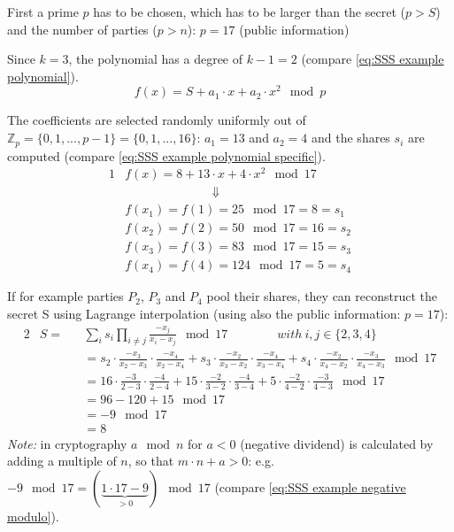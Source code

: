 		First a prime $p$ has to be chosen, which has to be larger than the secret ($p>S$) and the number of parties ($p>n$): $p=17$ (public information)
		
		Since $k=3$, the polynomial has a degree of $k-1=2$ (compare \ref{eq:SSS example polynomial}).
		\begin{equation}
		\label{eq:SSS example polynomial}
		f(x) = S + a_1 \cdot x + a_2 \cdot x^2 \mod p
		\end{equation}
		 
		 The coefficients are selected randomly uniformly out of $\mathbb{Z}_p=\{0,1,...,p-1\}=\{0,1,...,16\}$: $a_1=13$ and $a_2=4$ and the shares $s_i$ are computed (compare \ref{eq:SSS example polynomial specific}).
		 \begin{alignat}{1}
		 & f(x) = 8 + 13 \cdot x + 4 \cdot x^2 \mod 17 \label{eq:SSS example polynomial specific} \\
		 &\qquad \qquad \qquad \quad \Downarrow \nonumber \\ 
		 & f(x_1)=f(1)=25\mod17=8=s_1 \nonumber \\
		 & f(x_2)=f(2)=50\mod17=16=s_2 \nonumber \\
		 & f(x_3)=f(3)=83\mod17=15=s_3 \nonumber \\
		 & f(x_4)=f(4)=124\mod17=5=s_4 \nonumber 
		 \end{alignat}
		 
		 If for example parties $P_2$, $P_3$ and $P_4$ pool their shares, they can reconstruct the secret S using Lagrange interpolation (using also the public information: $p=17$):
		 \begin{alignat}{2}
		 & S = && \sum_i s_i \prod_{i \neq j} \frac{-x_j}{x_i - x_j } \mod 17 \qquad \qquad  with \ i,j \in \{2,3,4\} \\
		 & \quad && =s_2 \cdot \frac{-x_3}{x_2-x_3} \cdot \frac{-x_4}{x_2-x_4} + s_3 \cdot \frac{-x_2}{x_3-x_2} \cdot \frac{-x_4}{x_3-x_4} + s_4 \cdot \frac{-x_2}{x_4-x_2} \cdot \frac{-x_3}{x_4-x_3} \mod 17 \nonumber \\
		 & \quad && =16 \cdot \frac{-3}{2-3} \cdot \frac{-4}{2-4} + 15 \cdot \frac{-2}{3-2} \cdot \frac{-4}{3-4} + 5 \cdot \frac{-2}{4-2} \cdot \frac{-3}{4-3} \mod 17  \nonumber \\
		 & \quad && = 96-120+15 \mod 17 \nonumber \\
		 & \quad && = -9 \mod 17 \label{eq:SSS example negative modulo} \\
		 & \quad && = 8 \nonumber 
		 \end{alignat}
		 \textit{Note:} in cryptography $a \mod n$ for $a<0$ (negative dividend) is calculated by adding a multiple of  $n$, so that $m \cdot n+a>0$: e.g. $-9 \mod 17 = (\underbrace{1 \cdot 17-9}_{>0}) \mod 17$ (compare \ref{eq:SSS example negative modulo}).
		 
